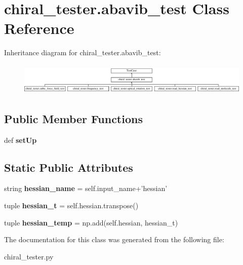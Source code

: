 \hypertarget{classchiral__tester_1_1abavib__test}{\section{chiral\+\_\+tester.\+abavib\+\_\+test Class Reference}
\label{classchiral__tester_1_1abavib__test}
}
Inheritance diagram for chiral\+\_\+tester.\+abavib\+\_\+test\+:\begin{figure}[H]
\begin{center}
\leavevmode
\includegraphics[height=1.534247cm]{classchiral__tester_1_1abavib__test}
\end{center}
\end{figure}
\subsection*{Public Member Functions}
\begin{DoxyCompactItemize}
\item 
\hypertarget{classchiral__tester_1_1abavib__test_a3abe45ea8e17ea9936776c832aac5cfb}{def {\bfseries set\+Up}}\label{classchiral__tester_1_1abavib__test_a3abe45ea8e17ea9936776c832aac5cfb}

\end{DoxyCompactItemize}
\subsection*{Static Public Attributes}
\begin{DoxyCompactItemize}
\item 
\hypertarget{classchiral__tester_1_1abavib__test_aa41e7bdb8a6b494a8e96274c2b97eba8}{string {\bfseries hessian\+\_\+name} = self.\+input\+\_\+name+'hessian'}\label{classchiral__tester_1_1abavib__test_aa41e7bdb8a6b494a8e96274c2b97eba8}

\item 
\hypertarget{classchiral__tester_1_1abavib__test_a3d2419940c78edc739e640754eaa0bb7}{tuple {\bfseries hessian\+\_\+t} = self.\+hessian.\+transpose()}\label{classchiral__tester_1_1abavib__test_a3d2419940c78edc739e640754eaa0bb7}

\item 
\hypertarget{classchiral__tester_1_1abavib__test_a9ca733f8f8484ac65ba00ef4403112c0}{tuple {\bfseries hessian\+\_\+temp} = np.\+add(self.\+hessian, hessian\+\_\+t)}\label{classchiral__tester_1_1abavib__test_a9ca733f8f8484ac65ba00ef4403112c0}

\end{DoxyCompactItemize}


The documentation for this class was generated from the following file\+:\begin{DoxyCompactItemize}
\item 
chiral\+\_\+tester.\+py\end{DoxyCompactItemize}
